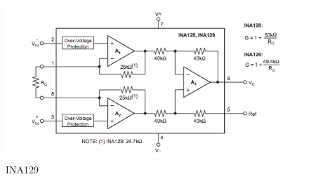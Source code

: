 \begin{figure}[H]
\begin{center}
\includegraphics[width=12cm]{implementation/figures/INA129}
\end{center}
\caption{INA129}
\label{fig:INA129}
\end{figure}
